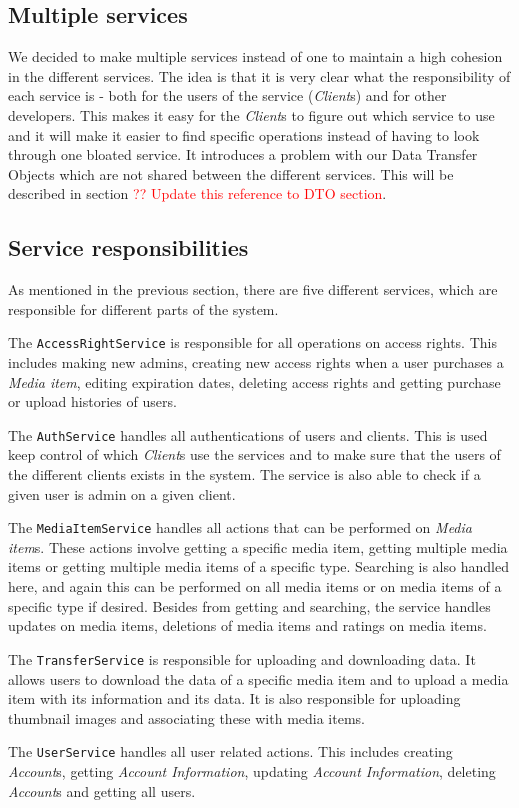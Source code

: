 \documentclass[../report.tex]{subfiles}
\begin{document}
\subsection{Multiple services}
We decided to make multiple services instead of one to maintain a high cohesion in the different services. The idea is that it is very clear what the responsibility of each service is - both for the users of the service (\textit{Client}s) and for other developers. This makes it easy for the \textit{Client}s to figure out which service to use and it will make it easier to find specific operations instead of having to look through one bloated service. It introduces a problem with our Data Transfer Objects which are not shared between the different services. This will be described in section \textcolor{red}{?? Update this reference to DTO section}. 

\subsection{Service responsibilities}
As mentioned in the previous section, there are five different services, which are responsible for different parts of the system. 

The \texttt{AccessRightService} is responsible for all operations on access rights. This includes making new admins, creating new access rights when a user purchases a \textit{Media item}, editing expiration dates, deleting access rights and getting purchase or upload histories of users. 

The \texttt{AuthService} handles all authentications of users and clients. This is used keep control of which \textit{Client}s use the services and to make sure that the users of the different clients exists in the system. The service is also able to check if a given user is admin on a given client.

The \texttt{MediaItemService} handles all actions that can be performed on \textit{Media item}s. These actions involve getting a specific media item, getting multiple media items or getting multiple media items of a specific type. Searching is also handled here, and again this can be performed on all media items or on media items of a specific type if desired. Besides from getting and searching, the service handles updates on media items, deletions of media items and ratings on media items.

The \texttt{TransferService} is responsible for uploading and downloading data. It allows users to download the data of a specific media item and to upload a media item with its information and its data. It is also responsible for uploading thumbnail images and associating these with media items.

The \texttt{UserService} handles all user related actions. This includes creating \textit{Account}s, getting \textit{Account Information}, updating \textit{Account Information}, deleting \textit{Account}s and getting all users. 
\end{document}
